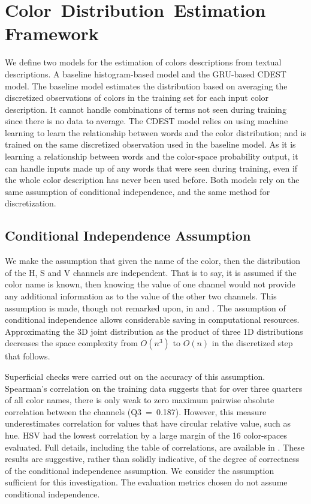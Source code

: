 \documentclass[11pt,a4paper]{article}
\newcommand{\textcite}{\citet}
\begin{document}
\section{Color~Distribution~Estimation Framework}\label{sec:method}
We define two models for the estimation of colors descriptions from textual descriptions.
A baseline histogram-based model and the GRU-based CDEST model.
The baseline model estimates the distribution based on averaging the discretized observations of colors in the training set for each input color description.
It cannot handle combinations of terms not seen during training since there is no data to average.
The CDEST model relies on using machine learning to learn the relationship between words and the color distribution; and is trained on the same discretized observation used in the baseline model.
As it is learning a relationship between words and the color-space probability output, it can handle inputs made up of any words that were seen during training, even if the whole color description has never been used before.
Both models rely on the same assumption of conditional independence, and the same method for discretization.


\subsection{Conditional Independence Assumption}\label{sec:conditional-independence-assumption}
We make the assumption that given the name of the color, then the distribution of the H, S and V channels are independent.
That is to say, it is assumed if the color name is known, then  knowing the value of one channel would not provide any additional information as to the value of the other two channels.
This assumption is made, though not remarked upon, in \textcite{meomcmahanstone:color} and \textcite{mcmahan2015bayesian}.
The assumption of conditional independence allows considerable saving in computational resources.
Approximating the 3D joint distribution as the product of three 1D distributions decreases the space complexity from $O(n^3)$ to $O(n)$ in the discretized step that follows.

Superficial checks were carried out on the accuracy of this assumption.
Spearman's correlation on the training data suggests that for over three quarters of all color names, there is only weak to zero maximum pairwise absolute correlation between the channels (\mbox{Q3 = 0.187}).
However, this measure underestimates correlation for values that have circular relative value, such as hue.
HSV had the lowest correlation by a large margin of the 16 color-spaces evaluated.
Full details, including the table of correlations, are available in .
These results are suggestive, rather than solidly indicative, of the degree of correctness of the conditional independence assumption.
We consider the assumption sufficient for this investigation.
The evaluation metrics chosen do not assume conditional independence.
\end{document}
